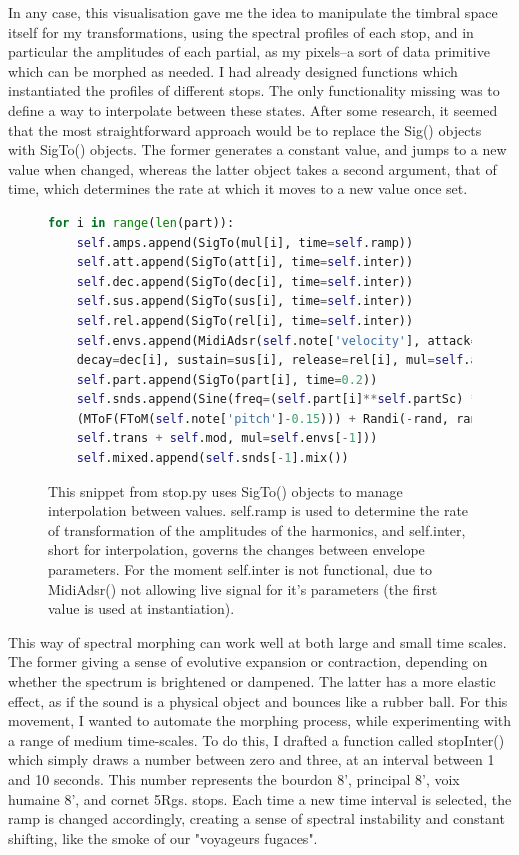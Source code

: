 \documentclass[12pt,twoside,maitrise]{dms_ks}
\theoremstyle{definition}
\begin{document}
In any case, this visualisation gave me the idea to manipulate the timbral space itself for my transformations, using the spectral profiles of each stop, and in particular the amplitudes of each partial, as my pixels--a sort of data primitive which can be morphed as needed.
I had already designed functions which instantiated the profiles of different stops.
The only functionality missing was to define a way to interpolate between these states.
After some research, it seemed that the most straightforward approach would be to replace the Sig() objects with SigTo() objects.
The former generates a constant value, and jumps to a new value when changed, whereas the latter object takes a second argument, that of time, which determines the rate at which it moves to a new value once set.

\begin{figure}[H]
\begin{lstlisting}[language=Python]
for i in range(len(part)):
    self.amps.append(SigTo(mul[i], time=self.ramp))
    self.att.append(SigTo(att[i], time=self.inter))
    self.dec.append(SigTo(dec[i], time=self.inter))
    self.sus.append(SigTo(sus[i], time=self.inter))
    self.rel.append(SigTo(rel[i], time=self.inter))
    self.envs.append(MidiAdsr(self.note['velocity'], attack=att[i],
    decay=dec[i], sustain=sus[i], release=rel[i], mul=self.amps[-1]))
    self.part.append(SigTo(part[i], time=0.2))
    self.snds.append(Sine(freq=(self.part[i]**self.partSc) * 
    (MToF(FToM(self.note['pitch']-0.15))) + Randi(-rand, rand, 5) + 
    self.trans + self.mod, mul=self.envs[-1]))
    self.mixed.append(self.snds[-1].mix())
\end{lstlisting}
\caption{This snippet from stop.py uses SigTo() objects to manage interpolation between values.
self.ramp is used to determine the rate of transformation of the amplitudes of the harmonics, and self.inter, short for interpolation, governs the changes between envelope parameters.
For the moment self.inter is not functional, due to MidiAdsr() not allowing live signal for it's parameters (the first value is used at instantiation).} 
\end{figure}

This way of spectral morphing can work well at both large and small time scales.
The former giving a sense of evolutive expansion or contraction, depending on whether the spectrum is brightened or dampened.
The latter has a more elastic effect, as if the sound is a physical object and bounces like a rubber ball.
For this movement, I wanted to automate the morphing process, while experimenting with a range of medium time-scales.
To do this, I drafted a function called stopInter() which simply draws a number between zero and three, at an interval between 1 and 10 seconds.
This number represents the bourdon 8', principal 8', voix humaine 8', and cornet 5Rgs.
stops.
Each time a new time interval is selected, the ramp is changed accordingly, creating a sense of spectral instability and constant shifting, like the smoke of our "voyageurs fugaces".
\end{document}
